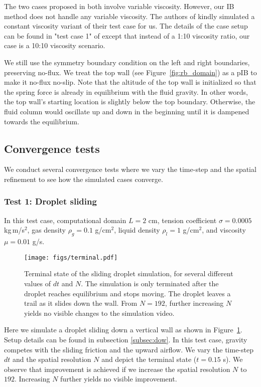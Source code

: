 \documentclass{jfm}
\begin{document}
The two cases proposed in \cite{rising_bubble} both involve variable viscosity. However, our IB method does not handle any variable viscosity. The authors of \citep{rising_bubble} kindly simulated a constant viscosity variant of their test case for us. The details of the case setup can be found in "test case 1" of \citep{rising_bubble} except that instead of a 1:10 viscosity ratio, our case is a 10:10 viscosity scenario. 
    
We still use the symmetry boundary condition on the left and right boundaries, preserving no-flux. We treat the top wall (see Figure~\ref{fig:rb_domain}) as a pIB to make it no-flux no-slip. Note that the altitude of the top wall is initialized so that the spring force is already in equilibrium with the fluid gravity. In other words, the top wall's starting location is slightly below the top boundary. Otherwise, the fluid column would oscillate up and down in the beginning until it is dampened towards the equilibrium. 

\subsection {Convergence tests}
We conduct several convergence tests where we vary the time-step and the spatial refinement to see how the simulated cases converge.

\subsubsection {Test 1: Droplet sliding}
In this test case, computational domain $L=2$ cm, tension coefficient $\sigma=0.0005$ kg\,m/s$^2$, gas density $\rho_g=0.1$ g/cm$^2$, liquid density $\rho_l=1$ g/cm$^2$, and viscosity $\mu=0.01$ g/s. 
\begin{figure}
\centering
\texttt{[image: figs/terminal.pdf]} 
\caption{Terminal state of the sliding droplet simulation, for several different values of $dt$ and $N$. The simulation is only terminated after the droplet reaches equilibrium and stops moving. The droplet leaves a trail as it slides down the wall. From $N = 192$, further increasing $N$ yields no visible changes to the simulation video.}
\label{fig:terminal}
\end{figure}
Here we simulate a droplet sliding down a vertical wall as shown in Figure~\ref{fig:terminal}. Setup details can be found in subsection \ref{subsec:dow}. In this test case, gravity competes with the sliding friction and the upward airflow. We vary the time-step $dt$ and the spatial resolution $N$ and depict the terminal state ($t = 0.15$ s). We observe that improvement is achieved if we increase the spatial resolution $N$ to $192$. Increasing $N$ further yields no visible improvement. 
\end{document}
